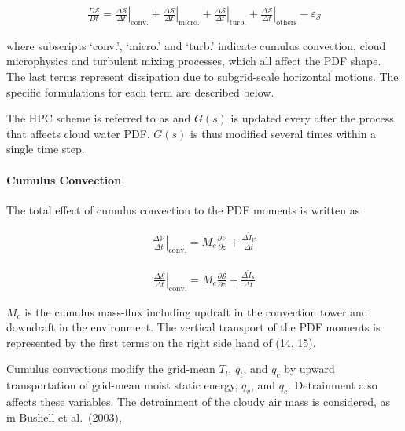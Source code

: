 \begin{eqnarray}
\frac{D \mathcal{S}}{D t}=\left.\frac{\Delta \mathcal{S}}{\Delta t}\right|_{\mathrm{conv.}}+\left.\frac{\Delta \mathcal{S}}{\Delta t}\right|_{\text {micro.}}+\left.\frac{\Delta \mathcal{S}}{\Delta t}
\right|_{\mathrm{turb.}}+\left.\frac{\Delta \mathcal{S}}{\Delta t}\right|_{\text {others}}-\varepsilon_{\mathcal{S}}
\end{eqnarray}

where subscripts `conv.', `micro.' and `turb.' indicate cumulus
convection, cloud microphysics and turbulent mixing processes, which all
affect the PDF shape. The last terms represent dissipation due to
subgrid-scale horizontal motions. The specific formulations for each
term are described below.

The HPC scheme is referred to as and \(G(s)\) is updated every after the
process that affects cloud water PDF. \(G(s)\) is thus modified several
times within a single time step.

\hypertarget{cumulus-convection}{%
\paragraph{Cumulus Convection}\label{cumulus-convection}}

The total effect of cumulus convection to the PDF moments is written as

\begin{eqnarray}
\left.\frac{\Delta \mathcal{V}}{\Delta t}\right|_{\mathrm{conv} .}=M_{c} \frac{\partial \mathcal{V}}{\partial z}+\frac{\Delta \tilde{I}_{\mathcal{V}}}{\Delta t}
\label{W09-14}
\end{eqnarray}

\begin{eqnarray}
\left.\frac{\Delta \mathcal{S}}{\Delta t}\right|_{\mathrm{conv} .}=M_{c} \frac{\partial \mathcal{S}}{\partial z}+\frac{\Delta \tilde{I}_{\mathcal{S}}}{\Delta t}
\label{W09-15}
\end{eqnarray}

\(M_c\) is the cumulus mass-flux including updraft in the convection
tower and downdraft in the environment. The vertical transport of the
PDF moments is represented by the first terms on the right side hand of
(14, 15).

Cumulus convections modify the grid-mean \(T_l\), \(q_t\), and \(q_c\)
by upward transportation of grid-mean moist static energy, \(q_v\), and
\(q_c\). Detrainment also affects these variables. The detrainment of
the cloudy air mass is considered, as in Bushell et al.~(2003),

